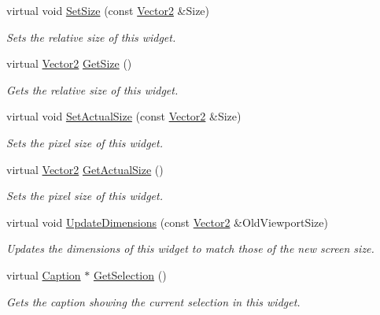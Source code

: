 \begin{DoxyCompactItemize}
virtual void \hyperlink{classphys_1_1UI_1_1DropDownList_aebcb4fe708e7d1af4609120039e276a6}{SetSize} (const \hyperlink{classphys_1_1Vector2}{Vector2} \&Size)
\begin{DoxyCompactList}\small\item\em Sets the relative size of this widget. \item\end{DoxyCompactList}\item 
virtual \hyperlink{classphys_1_1Vector2}{Vector2} \hyperlink{classphys_1_1UI_1_1DropDownList_ae47b0e9786a39a79fb613c2d1b1fcd38}{GetSize} ()
\begin{DoxyCompactList}\small\item\em Gets the relative size of this widget. \item\end{DoxyCompactList}\item 
virtual void \hyperlink{classphys_1_1UI_1_1DropDownList_ad85c38f98f467565f2b895993ab92f96}{SetActualSize} (const \hyperlink{classphys_1_1Vector2}{Vector2} \&Size)
\begin{DoxyCompactList}\small\item\em Sets the pixel size of this widget. \item\end{DoxyCompactList}\item 
virtual \hyperlink{classphys_1_1Vector2}{Vector2} \hyperlink{classphys_1_1UI_1_1DropDownList_afa9ccaef200f9ee8f22be5f32ba1f0a3}{GetActualSize} ()
\begin{DoxyCompactList}\small\item\em Sets the pixel size of this widget. \item\end{DoxyCompactList}\item 
virtual void \hyperlink{classphys_1_1UI_1_1DropDownList_aa204411b17521b92acb78926d1d3f98e}{UpdateDimensions} (const \hyperlink{classphys_1_1Vector2}{Vector2} \&OldViewportSize)
\begin{DoxyCompactList}\small\item\em Updates the dimensions of this widget to match those of the new screen size. \item\end{DoxyCompactList}\item 
virtual \hyperlink{classphys_1_1UI_1_1Caption}{Caption} $\ast$ \hyperlink{classphys_1_1UI_1_1DropDownList_a78b41941db0b3d8196249ab31d2b174a}{GetSelection} ()
\begin{DoxyCompactList}\small\item\em Gets the caption showing the current selection in this widget. \item\end{DoxyCompactList}\item 

\end{DoxyCompactItemize}
